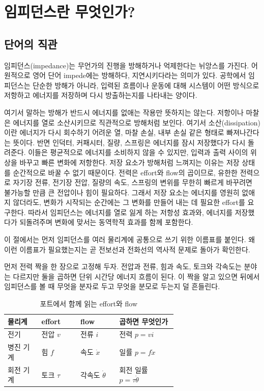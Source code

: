 \section{임피던스란 무엇인가?}

\subsection{단어의 직관}

임피던스(impedance)는 무언가의 진행을 방해하거나 억제한다는 뉘앙스를 가진다.
어원적으로 영어 단어 impede에는 방해하다, 지연시키다라는 의미가 있다.
공학에서 임피던스는 단순한 방해가 아니라, 입력된 흐름이나 운동에 대해 시스템이 어떤 방식으로 저항하고 에너지를 저장하며 다시 방출하는지를 나타내는 양이다.

여기서 말하는 방해가 반드시 에너지를 없애는 작용만 뜻하지는 않는다.
저항이나 마찰은 에너지를 열로 소산시키므로 직관적으로 방해처럼 보인다.
여기서 소산(dissipation)이란 에너지가 다시 회수하기 어려운 열, 마찰 손실, 내부 손실 같은 형태로 빠져나간다는 뜻이다.
반면 인덕터, 커패시터, 질량, 스프링은 에너지를 잠시 저장했다가 다시 돌려준다.
이들은 평균적으로 에너지를 소비하지 않을 수 있지만, 입력과 출력 사이의 위상을 바꾸고 빠른 변화에 저항한다.
저장 요소가 방해처럼 느껴지는 이유는 저장 상태를 순간적으로 바꿀 수 없기 때문이다.
전력은 effort와 flow의 곱이므로, 유한한 전력으로 자기장 전류, 전기장 전압, 질량의 속도, 스프링의 변위를 무한히 빠르게 바꾸려면 불가능할 만큼 큰 전압이나 힘이 필요하다.
그래서 저장 요소는 에너지를 영원히 없애지 않더라도, 변화가 시작되는 순간에는 그 변화를 만들어 내는 데 필요한 effort를 요구한다.
따라서 임피던스는 에너지를 열로 잃게 하는 저항성 효과와, 에너지를 저장했다가 되돌려주며 변화에 맞서는 동역학적 효과를 함께 포함한다.

이 절에서는 먼저 임피던스를 여러 물리계에 공통으로 쓰기 위한 이름표를 붙인다.
왜 이런 이름표가 필요했는지는 곧 전보선과 전화선의 역사적 문제로 돌아가 확인한다.

먼저 전력 짝을 한 장으로 고정해 두자.
전압과 전류, 힘과 속도, 토크와 각속도는 분야는 다르지만 둘을 곱하면 단위 시간당 에너지 흐름이 된다.
이 짝을 알고 있으면 뒤에서 임피던스를 볼 때 무엇을 분자로 두고 무엇을 분모로 두는지 덜 흔들린다.

\begin{table}[!htbp]
  \centering
  \caption{포트에서 함께 읽는 effort와 flow}
  \small
  \setlength{\tabcolsep}{4pt}
  \begin{tabularx}{\linewidth}{@{}>{\raggedright\arraybackslash}p{0.20\linewidth}>{\raggedright\arraybackslash}p{0.23\linewidth}>{\raggedright\arraybackslash}p{0.23\linewidth}>{\raggedright\arraybackslash}X@{}}
    \toprule
    물리계 & effort & flow & 곱하면 무엇인가 \\
    \midrule
    전기 & 전압 $v$ & 전류 $i$ & 전력 $p=vi$ \\
    병진 기계 & 힘 $f$ & 속도 $\dot{x}$ & 일률 $p=f\dot{x}$ \\
    회전 기계 & 토크 $\tau$ & 각속도 $\dot{\theta}$ & 회전 일률 $p=\tau\dot{\theta}$ \\
    \bottomrule
  \end{tabularx}
\end{table}

